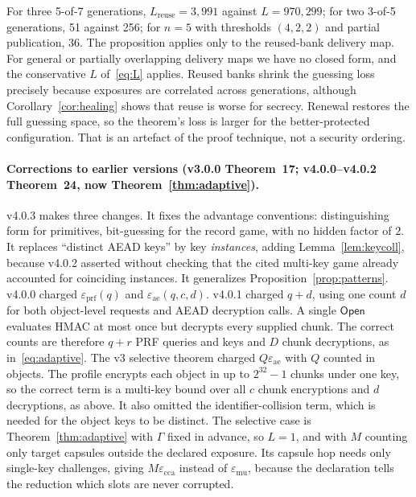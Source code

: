 \documentclass[pdflatex,sn-mathphys-num]{sn-jnl}
\theoremstyle{plain}
\theoremstyle{definition}
\begin{document}
For three 5-of-7 generations, $L_{\mathrm{reuse}}=3{,}991$ against $L=970{,}299$; for two 3-of-5 generations, 51 against 256; for $n=5$ with thresholds $(4,2,2)$ and partial publication, 36. The proposition applies only to the reused-bank delivery map. For general or partially overlapping delivery maps we have no closed form, and the conservative $L$ of~\eqref{eq:L} applies. Reused banks shrink the guessing loss precisely because exposures are correlated across generations, although Corollary~\ref{cor:healing} shows that reuse is worse for secrecy. Renewal restores the full guessing space, so the theorem's loss is larger for the better-protected configuration. That is an artefact of the proof technique, not a security ordering.

\paragraph{Corrections to earlier versions (v3.0.0 Theorem~17; v4.0.0--v4.0.2 Theorem~24, now Theorem~\ref{thm:adaptive}).}
v4.0.3 makes three changes. It fixes the advantage conventions: distinguishing form for primitives, bit-guessing for the record game, with no hidden factor of $2$. It replaces ``distinct AEAD keys'' by key \emph{instances}, adding Lemma~\ref{lem:keycoll}, because v4.0.2 asserted without checking that the cited multi-key game already accounted for coinciding instances. It generalizes Proposition~\ref{prop:patterns}. v4.0.0 charged $\varepsilon_{\mathrm{prf}}(q)$ and $\varepsilon_{\mathrm{ae}}(q,c,d)$. v4.0.1 charged $q+d$, using one count $d$ for both object-level requests and AEAD decryption calls. A single $\mathsf{Open}$ evaluates HMAC at most once but decrypts every supplied chunk. The correct counts are therefore $q+r$ PRF queries and keys and $D$ chunk decryptions, as in~\eqref{eq:adaptive}. The v3 selective theorem charged $Q\varepsilon_{\mathrm{ae}}$ with $Q$ counted in objects. The profile encrypts each object in up to $2^{32}-1$ chunks under one key, so the correct term is a multi-key bound over all $c$ chunk encryptions and $d$ decryptions, as above. It also omitted the identifier-collision term, which is needed for the object keys to be distinct. The selective case is Theorem~\ref{thm:adaptive} with $\Gamma$ fixed in advance, so $L=1$, and with $M$ counting only target capsules outside the declared exposure. Its capsule hop needs only single-key challenges, giving $M\varepsilon_{\mathrm{cca}}$ instead of $\varepsilon_{\mathrm{mu}}$, because the declaration tells the reduction which slots are never corrupted.
\end{document}
